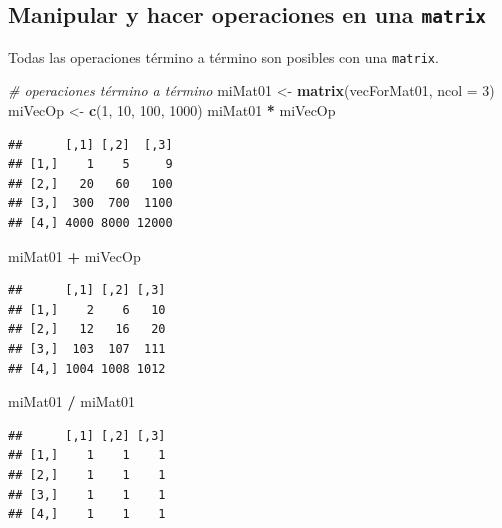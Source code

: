 \documentclass[
]{book}
\newenvironment{Shaded}{\begin{snugshade}}{\end{snugshade}}
\newcommand{\CommentTok}[1]{\textcolor[rgb]{0.56,0.35,0.01}{\textit{#1}}}
\newcommand{\DataTypeTok}[1]{\textcolor[rgb]{0.13,0.29,0.53}{#1}}
\newcommand{\DecValTok}[1]{\textcolor[rgb]{0.00,0.00,0.81}{#1}}
\newcommand{\KeywordTok}[1]{\textcolor[rgb]{0.13,0.29,0.53}{\textbf{#1}}}
\newcommand{\NormalTok}[1]{#1}
\newcommand{\OperatorTok}[1]{\textcolor[rgb]{0.81,0.36,0.00}{\textbf{#1}}}
\newcommand{\StringTok}[1]{\textcolor[rgb]{0.31,0.60,0.02}{#1}}
\begin{document}
\hypertarget{manipular-y-hacer-operaciones-en-una-matrix}{%
\subsection{\texorpdfstring{Manipular y hacer operaciones en una \texttt{matrix}}{Manipular y hacer operaciones en una matrix}}\label{manipular-y-hacer-operaciones-en-una-matrix}}

Todas las operaciones término a término son posibles con una \texttt{matrix}.

\begin{Shaded}
\begin{Highlighting}[]
\CommentTok{# operaciones término a término}
\NormalTok{miMat01 <-}\StringTok{ }\KeywordTok{matrix}\NormalTok{(vecForMat01, }\DataTypeTok{ncol =} \DecValTok{3}\NormalTok{)}
\NormalTok{miVecOp <-}\StringTok{ }\KeywordTok{c}\NormalTok{(}\DecValTok{1}\NormalTok{, }\DecValTok{10}\NormalTok{, }\DecValTok{100}\NormalTok{, }\DecValTok{1000}\NormalTok{)}
\NormalTok{miMat01 }\OperatorTok{*}\StringTok{ }\NormalTok{miVecOp}
\end{Highlighting}
\end{Shaded}

\begin{verbatim}
##      [,1] [,2]  [,3]
## [1,]    1    5     9
## [2,]   20   60   100
## [3,]  300  700  1100
## [4,] 4000 8000 12000
\end{verbatim}

\begin{Shaded}
\begin{Highlighting}[]
\NormalTok{miMat01 }\OperatorTok{+}\StringTok{ }\NormalTok{miVecOp}
\end{Highlighting}
\end{Shaded}

\begin{verbatim}
##      [,1] [,2] [,3]
## [1,]    2    6   10
## [2,]   12   16   20
## [3,]  103  107  111
## [4,] 1004 1008 1012
\end{verbatim}

\begin{Shaded}
\begin{Highlighting}[]
\NormalTok{miMat01 }\OperatorTok{/}\StringTok{ }\NormalTok{miMat01}
\end{Highlighting}
\end{Shaded}

\begin{verbatim}
##      [,1] [,2] [,3]
## [1,]    1    1    1
## [2,]    1    1    1
## [3,]    1    1    1
## [4,]    1    1    1
\end{verbatim}
\end{document}
